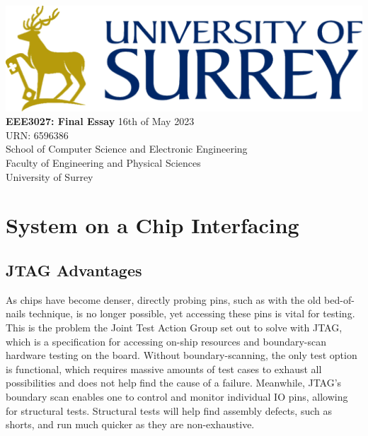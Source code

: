 \documentclass[11pt]{article}
\begin{document}
\begin{titlepage}
    \begin{center}
    \includegraphics[width=\textwidth]{Logo.png} %
    \vfill
    \Huge
    \textbf{EEE3027: Final Essay}
    \vfill
    \huge
    \vspace{1cm}
    \Large
    16th of May 2023\\
    URN: 6596386\\
    \vfill
    \vfill
    \Large
    School of Computer Science and Electronic Engineering\\
    Faculty of Engineering and Physical Sciences\\
    University of Surrey\\
    \end{center}
\end{titlepage}

\renewcommand{\thesection}{\Alph{section}}
\renewcommand{\thesubsection}{\Alph{section})\alph{subsection}}


\vspace{1cm}
\tableofcontents
\pagebreak

\section{System on a Chip Interfacing}
\subsection{JTAG Advantages}
As chips have become denser, directly probing pins, such as with the old bed-of-nails technique, is no longer possible, yet accessing these pins is vital for testing.
This is the problem the Joint Test Action Group set out to solve with JTAG, which is a specification for accessing on-ship resources and boundary-scan hardware testing on the board\cite{jtag_tutorial}.
Without boundary-scanning, the only test option is functional, which requires massive amounts of test cases to exhaust all possibilities and does not help find the cause of a failure.
Meanwhile, JTAG's boundary scan enables one to control and monitor individual IO pins, allowing for structural tests. 
Structural tests will help find assembly defects, such as shorts, and run much quicker as they are non-exhaustive.
\end{document}
